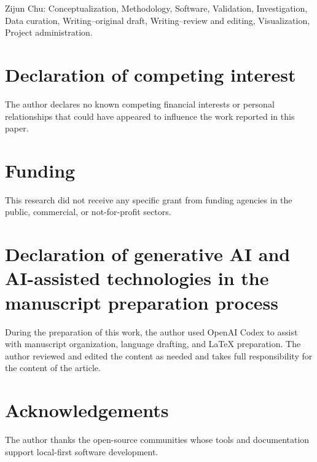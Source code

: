 \documentclass[preprint,12pt,a4paper]{elsarticle}
\begin{document}
Zijun Chu: Conceptualization, Methodology, Software, Validation, Investigation,
Data curation, Writing--original draft, Writing--review and editing,
Visualization, Project administration.

\section*{Declaration of competing interest}

The author declares no known competing financial interests or personal
relationships that could have appeared to influence the work reported in this
paper.

\section*{Funding}

This research did not receive any specific grant from funding agencies in the
public, commercial, or not-for-profit sectors.

\section*{Declaration of generative AI and AI-assisted technologies in the manuscript preparation process}

During the preparation of this work, the author used OpenAI Codex to assist with
manuscript organization, language drafting, and LaTeX preparation. The author
reviewed and edited the content as needed and takes full responsibility for the
content of the article.

\section*{Acknowledgements}

The author thanks the open-source communities whose tools and documentation
support local-first software development.
\end{document}
